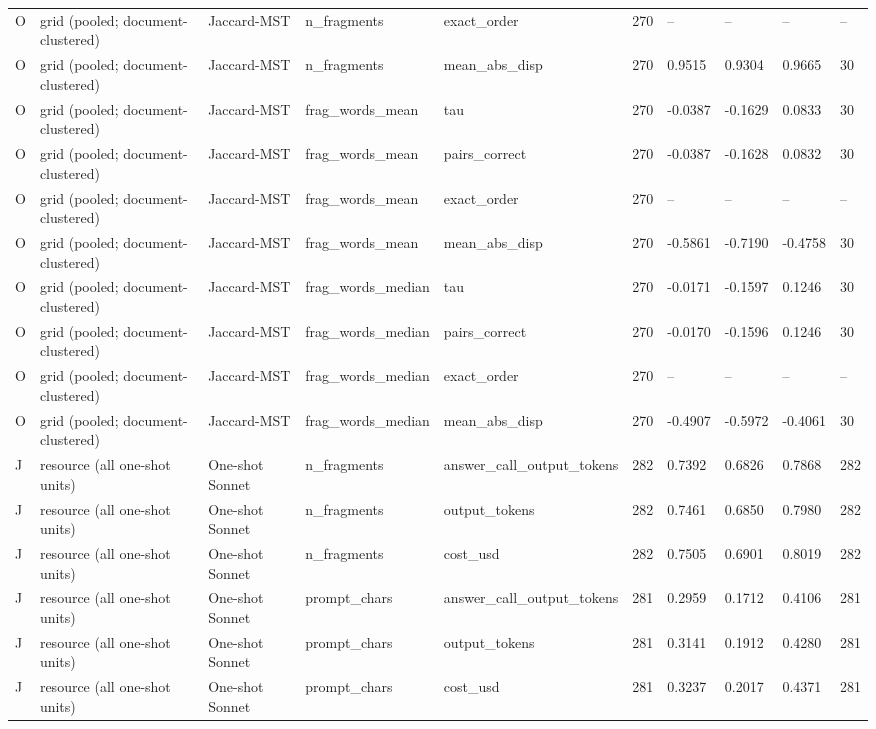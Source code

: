 \begin{table}[t]
{\begin{tabular}{llllllllll}
O & grid (pooled; document-clustered) & Jaccard-MST & n\_fragments & exact\_order & 270 & -- & -- & -- & -- \\
O & grid (pooled; document-clustered) & Jaccard-MST & n\_fragments & mean\_abs\_disp & 270 & 0.9515 & 0.9304 & 0.9665 & 30 \\
O & grid (pooled; document-clustered) & Jaccard-MST & frag\_words\_mean & tau & 270 & -0.0387 & -0.1629 & 0.0833 & 30 \\
O & grid (pooled; document-clustered) & Jaccard-MST & frag\_words\_mean & pairs\_correct & 270 & -0.0387 & -0.1628 & 0.0832 & 30 \\
O & grid (pooled; document-clustered) & Jaccard-MST & frag\_words\_mean & exact\_order & 270 & -- & -- & -- & -- \\
O & grid (pooled; document-clustered) & Jaccard-MST & frag\_words\_mean & mean\_abs\_disp & 270 & -0.5861 & -0.7190 & -0.4758 & 30 \\
O & grid (pooled; document-clustered) & Jaccard-MST & frag\_words\_median & tau & 270 & -0.0171 & -0.1597 & 0.1246 & 30 \\
O & grid (pooled; document-clustered) & Jaccard-MST & frag\_words\_median & pairs\_correct & 270 & -0.0170 & -0.1596 & 0.1246 & 30 \\
O & grid (pooled; document-clustered) & Jaccard-MST & frag\_words\_median & exact\_order & 270 & -- & -- & -- & -- \\
O & grid (pooled; document-clustered) & Jaccard-MST & frag\_words\_median & mean\_abs\_disp & 270 & -0.4907 & -0.5972 & -0.4061 & 30 \\
J & resource (all one-shot units) & One-shot Sonnet & n\_fragments & answer\_call\_output\_tokens & 282 & 0.7392 & 0.6826 & 0.7868 & 282 \\
J & resource (all one-shot units) & One-shot Sonnet & n\_fragments & output\_tokens & 282 & 0.7461 & 0.6850 & 0.7980 & 282 \\
J & resource (all one-shot units) & One-shot Sonnet & n\_fragments & cost\_usd & 282 & 0.7505 & 0.6901 & 0.8019 & 282 \\
J & resource (all one-shot units) & One-shot Sonnet & prompt\_chars & answer\_call\_output\_tokens & 281 & 0.2959 & 0.1712 & 0.4106 & 281 \\
J & resource (all one-shot units) & One-shot Sonnet & prompt\_chars & output\_tokens & 281 & 0.3141 & 0.1912 & 0.4280 & 281 \\
J & resource (all one-shot units) & One-shot Sonnet & prompt\_chars & cost\_usd & 281 & 0.3237 & 0.2017 & 0.4371 & 281 \\

\end{tabular}}
\end{table}
